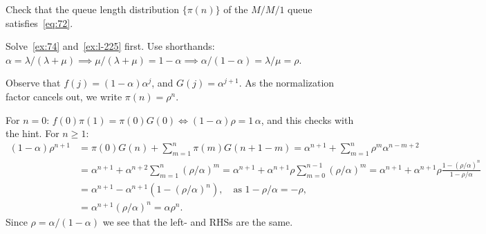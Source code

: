 \begin{exercise}\label{ex:l-229}
Check
 that the queue length distribution $\{\pi(n)\}$ of the $M/M/1$ queue satisfies~\cref{eq:72}.
\begin{hint}
Solve~\cref{ex:74} and~\cref{ex:l-225} first. Use shorthands:
$\alpha=\lambda/(\lambda+\mu) \implies \mu/(\lambda+\mu) = 1-\alpha \implies \alpha/(1-\alpha) = \lambda /\mu = \rho$.
\end{hint}
\begin{solution}
Observe that $f(j)=(1-\alpha)\alpha^j$, and $G(j) = \alpha^{j+1}$. As the normalization factor cancels out, we write $\pi(n) = \rho^n$.

For $n=0$: $f(0) \pi(1) = \pi(0) G(0) \iff (1-\alpha) \rho  = 1\, \alpha$, and this checks with the hint.
For $n\geq 1$:
\begin{align*}
 (1-\alpha)\rho^{n+1}
&= \pi(0) G(n) + \sum_{m=1}^n\pi(m) G(n+1-m)
=\alpha^{n+1} + \sum_{m=1}^n \rho^m \alpha^{n-m+2} \\
&= \alpha^{n+1} + \alpha^{n+2}\sum_{m=1}^n (\rho/\alpha)^m
= \alpha^{n+1} + \alpha^{n+1}\rho \sum_{m=0}^{n-1} (\rho/\alpha)^m
= \alpha^{n+1} + \alpha^{n+1}\rho \frac{1-(\rho/\alpha)^n}{1-\rho/\alpha}\\
&= \alpha^{n+1} - \alpha^{n+1}(1-(\rho/\alpha)^n), \quad\text{as } 1- \rho/\alpha = -\rho,\\
&= \alpha^{n+1}(\rho/\alpha)^n = \alpha \rho^n.
\end{align*}
Since $\rho=\alpha/(1-\alpha)$ we see that the left- and RHSs are the same.
\end{solution}
\end{exercise}




